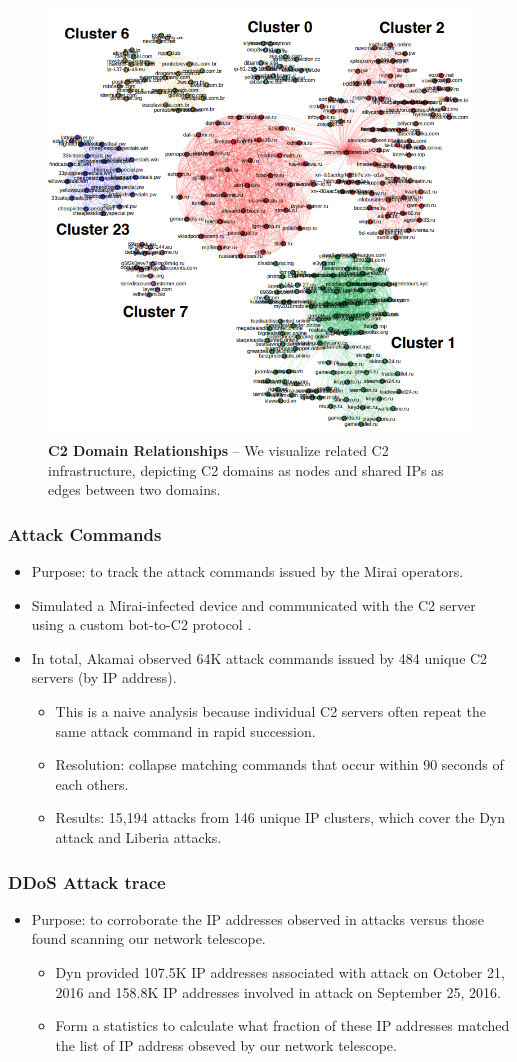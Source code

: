 \documentclass{beamer}
\begin{document}
\begin{frame}
	\begin{figure}
		\includegraphics[width=50 mm, scale = 0.5]{C2DomainRelationship.png}
		\caption{ \textbf{C2 Domain Relationships} -- We visualize related C2 infrastructure, depicting C2 domains as nodes and shared IPs as edges between two domains.}
	\end{figure}
\end{frame}

\begin{frame}
	\frametitle{Attack Commands}
	\begin{itemize}
		\item<+-> Purpose: to track the attack commands issued by the Mirai operators.
		\item<+-> Simulated a Mirai-infected device and communicated with the C2 server using a custom bot-to-C2 protocol .
		\item<+-> In total, Akamai observed 64K attack commands issued by 484 unique C2 servers  (by IP address).
		\begin{itemize}
			\item<+-> This is a naive analysis because individual C2 servers often repeat the same attack command in rapid succession.
			\item<+-> Resolution: collapse matching commands that occur within 90 seconds of each others.
			\item<+-> Results: 15,194 attacks from 146 unique IP clusters, which cover the Dyn attack and Liberia attacks.
		\end{itemize}
	\end{itemize}
\end{frame}

\begin{frame}
	\frametitle{DDoS Attack trace}
	\begin{itemize}
		\item<+-> Purpose: to corroborate the IP addresses observed in attacks versus those found scanning our network telescope.
		\begin{itemize}
			\item<+-> Dyn provided 107.5K IP addresses associated
with attack on October 21, 2016 and 158.8K IP addresses involved in attack on September 25, 2016.
			\item<+-> Form a statistics to calculate what fraction of these IP addresses matched the list of IP address obseved by our network telescope.
		\end{itemize}
	\end{itemize}
\end{frame}
\end{document}
